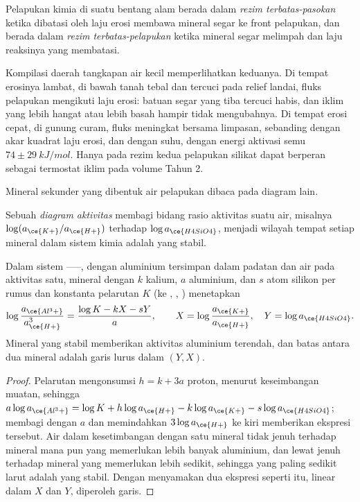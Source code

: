 \begin{definition}\label{def:b3:water-rock-interaction:regimes}
Pelapukan kimia di suatu bentang alam berada dalam \emph{rezim
terbatas-pasokan} ketika dibatasi oleh laju
erosi membawa mineral segar ke front pelapukan, dan berada dalam
\emph{rezim terbatas-pelapukan} ketika mineral
segar melimpah dan laju reaksinya yang membatasi.
\end{definition}

Kompilasi daerah tangkapan air kecil memperlihatkan keduanya. Di tempat erosinya lambat, di bawah
tanah tebal dan tercuci pada relief landai, fluks pelapukan mengikuti
laju erosi: batuan segar yang tiba tercuci habis, dan iklim yang
lebih hangat atau lebih basah hampir tidak mengubahnya. Di tempat erosi cepat, di gunung curam, fluks
meningkat bersama limpasan, sebanding dengan akar kuadrat laju erosi, dan dengan
suhu, dengan energi aktivasi semu $74 \pm
\qty{29}{kJ/mol}$. Hanya pada rezim kedua pelapukan silikat dapat berperan sebagai
termostat iklim pada volume Tahun 2.

Mineral sekunder yang dibentuk air pelapukan dibaca pada
diagram lain.

\begin{definition}\label{def:b3:water-rock-interaction:activity-diagram}
Sebuah \emph{diagram aktivitas}
membagi bidang rasio aktivitas suatu air, misalnya
$\log(a_{\ce{K+}}/a_{\ce{H+}})$ terhadap $\log a_{\ce{H4SiO4}}$, menjadi
wilayah tempat setiap mineral dalam sistem kimia adalah yang stabil.
\end{definition}

\begin{proposition}\label{prop:b3:water-rock-interaction:boundaries}
Dalam sistem ------, dengan aluminium tersimpan dalam padatan
dan air pada aktivitas satu, mineral dengan $k$ kalium, $a$ aluminium, dan
$s$ atom silikon per rumus dan konstanta pelarutan $K$ (ke ,
, ) menetapkan
\[
\log\frac{a_{\ce{Al^3+}}}{a_{\ce{H+}}^3} = \frac{\log K - kX - sY}{a},
\qquad X = \log\frac{a_{\ce{K+}}}{a_{\ce{H+}}},\quad Y = \log a_{\ce{H4SiO4}}.
\]
Mineral yang stabil memberikan aktivitas aluminium terendah, dan batas
antara dua mineral adalah garis lurus dalam $(Y, X)$.
\end{proposition}

\begin{proof}
Pelarutan mengonsumsi $h = k + 3a$ proton, menurut keseimbangan muatan, sehingga $a\log
a_{\ce{Al^3+}} = \log K + h\log a_{\ce{H+}} - k\log a_{\ce{K+}} - s\log
a_{\ce{H4SiO4}}$; membagi dengan $a$ dan memindahkan $3\log a_{\ce{H+}}$ ke kiri
memberikan ekspresi tersebut. Air dalam kesetimbangan dengan satu mineral
tidak jenuh terhadap mineral mana pun yang memerlukan lebih banyak aluminium, dan
lewat jenuh terhadap mineral yang memerlukan lebih sedikit, sehingga yang paling sedikit larut
adalah yang stabil. Dengan menyamakan dua ekspresi seperti itu, linear dalam $X$ dan $Y$, diperoleh garis.
\end{proof}

